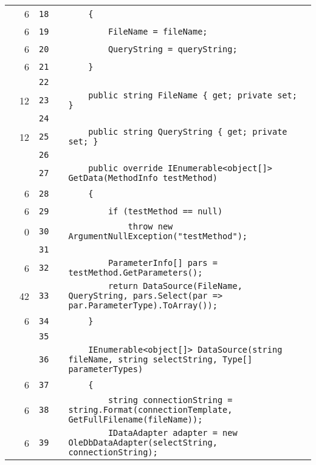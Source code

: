 \documentclass[a4paper,landscape,10pt]{article}
\begin{document}
\begin{longtable}[l]{lrrll}
\cellcolor{green} & 6 & \verb~18~ & & \verb~    {~\\
\cellcolor{green} & 6 & \verb~19~ & & \verb~        FileName = fileName;~\\
\cellcolor{green} & 6 & \verb~20~ & & \verb~        QueryString = queryString;~\\
\cellcolor{green} & 6 & \verb~21~ & & \verb~    }~\\
\cellcolor{gray} &  & \verb~22~ & & \verb~~\\
\cellcolor{green} & 12 & \verb~23~ & & \verb~    public string FileName { get; private set; }~\\
\cellcolor{gray} &  & \verb~24~ & & \verb~~\\
\cellcolor{green} & 12 & \verb~25~ & & \verb~    public string QueryString { get; private set; }~\\
\cellcolor{gray} &  & \verb~26~ & & \verb~~\\
\cellcolor{gray} &  & \verb~27~ & & \verb~    public override IEnumerable<object[]> GetData(MethodInfo testMethod)~\\
\cellcolor{green} & 6 & \verb~28~ & & \verb~    {~\\
\cellcolor{orange} & 6 & \verb~29~ & & \verb~        if (testMethod == null)~\\
\cellcolor{red} & 0 & \verb~30~ & & \verb~            throw new ArgumentNullException("testMethod");~\\
\cellcolor{gray} &  & \verb~31~ & & \verb~~\\
\cellcolor{green} & 6 & \verb~32~ & & \verb~        ParameterInfo[] pars = testMethod.GetParameters();~\\
\cellcolor{green} & 42 & \verb~33~ & & \verb~        return DataSource(FileName, QueryString, pars.Select(par => par.ParameterType).ToArray());~\\
\cellcolor{green} & 6 & \verb~34~ & & \verb~    }~\\
\cellcolor{gray} &  & \verb~35~ & & \verb~~\\
\cellcolor{gray} &  & \verb~36~ & & \verb~    IEnumerable<object[]> DataSource(string fileName, string selectString, Type[] parameterTypes)~\\
\cellcolor{green} & 6 & \verb~37~ & & \verb~    {~\\
\cellcolor{green} & 6 & \verb~38~ & & \verb~        string connectionString = string.Format(connectionTemplate, GetFullFilename(fileName));~\\
\cellcolor{green} & 6 & \verb~39~ & & \verb~        IDataAdapter adapter = new OleDbDataAdapter(selectString, connectionString);~\\

\end{longtable}
\end{document}
